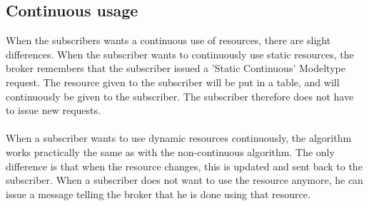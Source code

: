 		\subsection{Continuous usage}
		When the subscribers wants a continuous use of resources, there are slight differences. When the 
		subscriber wants to continuously use static resources, the broker remembers that the subscriber 
		issued a 'Static Continuous' Modeltype request. The resource given to the subscriber will be put in a 
		table, and will continuously be given to the subscriber. The subscriber therefore does not have to 
		issue new requests. \\
		\\
		When a subscriber wants to use dynamic resources continuously, the algorithm 
		works practically the same as with the non-continuous algorithm. The only difference is that when 
		the resource changes, this is updated and sent back to the subscriber.
		When a subscriber does not want to use the resource anymore, he can issue a message telling the 
		broker that he is done using that resource.
